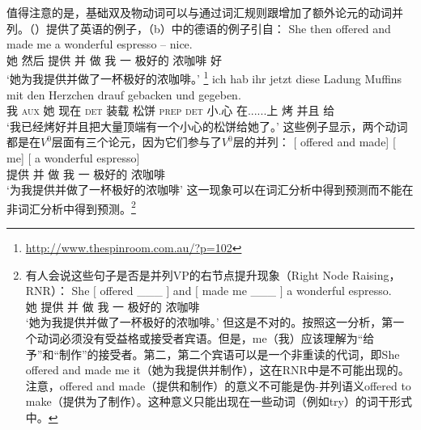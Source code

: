 \noindent
    值得注意的是，基础双及物动词可以与通过词汇规则跟增加了额外论元的动词并列。（）提供了英语的例子，（b）中的德语的例子引自：
\eal
\label{promise-make}
\ex 
\gll She then offered and made me a wonderful espresso -- nice.\\
     她  然后 提供 并 做 我 一 极好的 浓咖啡 {} 好\\
\glt `她为我提供并做了一杯极好的浓咖啡。'  
\footnote{%
\url{http://www.thespinroom.com.au/?p=102} 
}
\ex 
\label{ex-gebacken-und-gegeben}
\gll ich hab ihr jetzt diese Ladung Muffins mit den Herzchen drauf gebacken und gegeben.\footnotemark\\
     我 \textsc{aux} 她 现在 \textsc{det} 装载 松饼 \textsc{prep} \textsc{det} 小.心 在......上 烤 并且 给\\
\glt `我已经烤好并且把大量顶端有一个小心的松饼给她了。'
\zl
\noindent
这些例子显示，两个动词都是在$V^0$层面有三个论元，因为它们参与了$V^0$层的并列：
\ea
\gll 
{}[\sub{\vnull} offered and made] [ me]    [ a wonderful espresso] \\
{}\spacebr{} 提供 并 做 \spacebr{} 我 \spacebr{} 一 极好的 浓咖啡\\
\glt `为我提供并做了一杯极好的浓咖啡'
\z
这一现象可以在词汇分析中得到预测而不能在非词汇分析中得到预测。\footnote{%
有人会说这些句子是否是并列VP的右节点提升现象（Right Node Raising，RNR）\citep{Bresnan74a-u, Abbott76a-u}： 
\ea \label{rnr}
\gll
She $[$ offered  \_\_\_  $]$ and $[$ made me \_\_\_ $]$  a wonderful espresso. \\
她 \spacebr{} 提供 {} \spacebr{} 并 \spacebr{} 做 我 {} \spacebr{} 一 极好的 浓咖啡\\
\glt `她为我提供并做了一杯极好的浓咖啡。'
\z
但这是不对的。按照这一分析，第一个动词必须没有受益格或接受者宾语。但是，me（我）应该理解为“给予”和“制作”的接受者。第二，第二个宾语可以是一个非重读的代词，即She offered and made me it（她为我提供并制作），这在RNR中是不可能出现的。注意，offered and made（提供和制作）的意义不可能是伪-并列语义offered to make（提供为了制作）。这种意义只能出现在一些动词（例如try）的词干形式中。
}  

